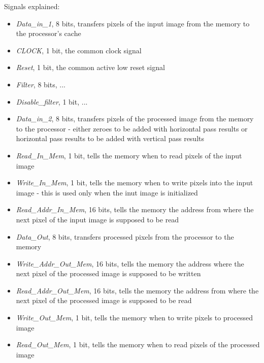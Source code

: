 \documentclass[11pt,a4paper]{article}
\begin{document}
Signals explained:
\begin{itemize}
		\item \textit{Data\_in\_1}, 8 bits, transfers pixels of the input image from the memory to the processor's cache
		\item \textit{CLOCK}, 1 bit, the common clock signal
		\item \textit{Reset}, 1 bit, the common active low reset signal
		\item \textit{Filter}, 8 bits, ...
		\item \textit{Disable\_filter}, 1 bit, ...
		\item \textit{Data\_in\_2}, 8 bits, transfers pixels of the processed image from the memory to the processor - either zeroes to be added with horizontal pass results or horizontal pass results to be added with vertical pass results
		\item \textit{Read\_In\_Mem}, 1 bit, tells the memory when to read pixels of the input image
		\item \textit{Write\_In\_Mem}, 1 bit, tells the memory when to write pixels into the input image - this is used only when the inut image is initialized
		\item \textit{Read\_Addr\_In\_Mem}, 16 bits, tells the memory the address from where the next pixel of the input image is supposed to be read
		\item \textit{Data\_Out}, 8 bits, transfers processed pixels from the processor to the memory
		\item \textit{Write\_Addr\_Out\_Mem}, 16 bits, tells the memory the address where the next pixel of the processed image is supposed to be written
		\item \textit{Read\_Addr\_Out\_Mem}, 16 bits, tells the memory the address from where the next pixel of the processed image is supposed to be read
		\item \textit{Write\_Out\_Mem}, 1 bit, tells the memory when to write pixels to processed image
		\item \textit{Read\_Out\_Mem}, 1 bit, tells the memory when to read pixels of the processed image
\end{itemize}
\end{document}
